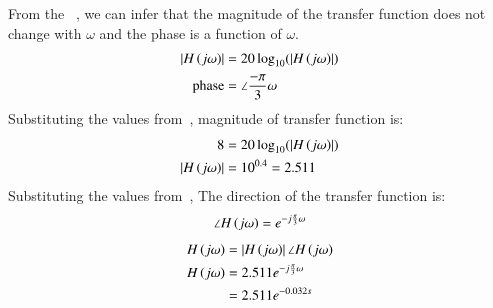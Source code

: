 \documentclass[journal,12pt,twocolumn]{IEEEtran}
\theoremstyle{remark}
\begin{document}
    \solution
    From the ~, we can infer that the magnitude of the transfer function does not change with $\omega$ and the phase is a function of $\omega$.
    \begin{align}
        \left\vert{H}\left(j\omega\right)\right\vert&= 20\log_{10}(\left\vert{H}\left(j\omega\right)\right\vert) \\
        \text{phase} &= \angle \frac{-\pi}{3}\omega
    \end{align}
    Substituting the values from~, magnitude of transfer function is:
    \begin{align}
        8 &= 20\log_{10}(\left\vert{H}\left(j\omega\right)\right\vert)\\
        \left\vert{H}\left(j\omega\right)\right\vert &= 10^{0.4} = 2.511
    \end{align}
    Substituting the values from~, The direction of the transfer function is:
    \begin{align}
        \angle H\left(j\omega\right) = e^{-j\frac{\pi}{3}\omega}
    \end{align}
    \begin{align}
        H\left(j\omega\right) &= \left\vert H\left(j\omega\right)\right\vert\angle H\left(j\omega\right)\\
        H\left(j\omega\right) &= 2.511 e^{-j\frac{\pi}{3}\omega} \\
        &= 2.511 e^{-0.032s}
    \end{align}
    \setcounter{figure}{1} %
\end{document}
